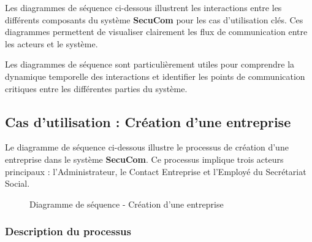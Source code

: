 \noindent Les diagrammes de séquence ci-dessous illustrent les interactions entre les différents composants du système \textbf{SecuCom} pour les cas d'utilisation clés. Ces diagrammes permettent de visualiser clairement les flux de communication entre les acteurs et le système.

\begin{note}
Les diagrammes de séquence sont particulièrement utiles pour comprendre la dynamique temporelle des interactions et identifier les points de communication critiques entre les différentes parties du système.
\end{note}

\subsection{Cas d'utilisation : Création d'une entreprise}

\noindent Le diagramme de séquence ci-dessous illustre le processus de création d'une entreprise dans le système \textbf{SecuCom}. Ce processus implique trois acteurs principaux : l'Administrateur, le Contact Entreprise et l'Employé du Secrétariat Social.

\vspace{0.5cm}

\begin{figure}[H]
\caption{Diagramme de séquence - Création d'une entreprise}
\end{figure}

\vspace{0.5cm}

\subsubsection{Description du processus}

